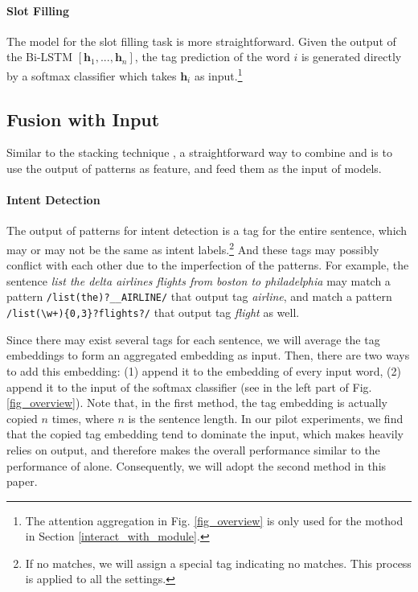 \paragraph{Slot Filling}
The model for the slot filling task is more straightforward. Given the output of the Bi-LSTM $[\textbf{h}_1, ..., \textbf{h}_n]$, the tag prediction of the word $i$ is generated directly by a softmax classifier which takes $\textbf{h}_i$ as input.\footnote{The attention aggregation in Fig. \ref{fig_overview} is only used for the mothod in Section \ref{interact_with_module}.}


\subsection{Fusion with Input}
\label{fusion_with_input}
Similar to the stacking technique \cite{wolpert1992stacked}, a straightforward way to combine \RE and \NN is to use the output of \RE patterns as feature, and feed them as the input of \NN models.
\paragraph{Intent Detection}
The output of \RE patterns for intent detection is a tag for the entire sentence, which may or may not be the same as intent labels.\footnote{If no \RE matches, we will assign a special tag indicating no matches. This process is applied to all the settings.} 
And these tags may possibly conflict with each other due to the imperfection of the patterns. 
For example, the sentence \emph{list the delta airlines flights from boston to philadelphia} may match a pattern \texttt{/list(\;the)?\;\_\_AIRLINE/} that output tag \emph{airline}, 
and match a pattern \texttt{/list(\;\textbackslash w+)\{0,3\}?\;flights?/} that output tag \emph{flight} as well.

Since there may exist several tags for each sentence, we will average the tag embeddings to form an aggregated embedding as input. 
Then, there are two ways to add this embedding: (1) append it to the embedding of every input word, (2) append it to the input of the softmax classifier (see  in the left part of Fig. \ref{fig_overview}). Note that, in the first method, the tag embedding is actually copied $n$ times, where $n$ is the sentence length. In our pilot experiments, we find that the copied tag embedding tend to dominate the input, which makes \NN heavily relies on \RE output, and therefore makes the overall performance similar to the performance of \RE alone. Consequently, we will adopt the second method in this paper.

